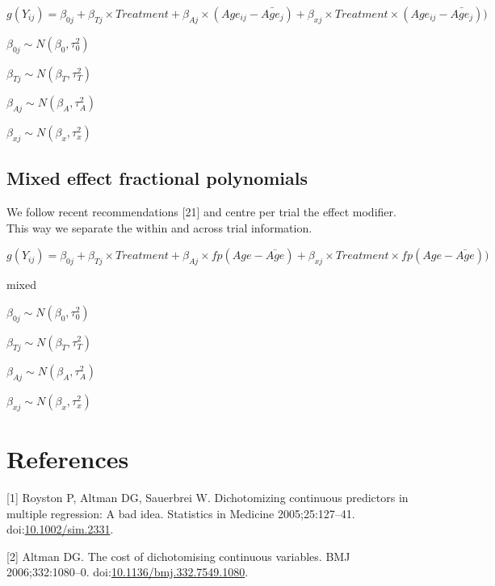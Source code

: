 \documentclass[14pt,]{article}
\let\oldsubparagraph\subparagraph
\renewcommand{\subparagraph}[1]{\oldsubparagraph{#1}\mbox{}}
\begin{document}
\(g(Y_{ij}) = \beta_{0j} + \beta_{Tj} \times Treatment + \beta_{Aj} \times( Age_{ij} - \bar{Age_{j}}) + \beta_{xj} \times Treatment \times ( Age_{ij} - \bar{Age_{j}}))\)

\(\beta_{0j} \sim N(\beta_{0}, \tau_{0}^2)\)

\(\beta_{Tj} \sim N(\beta_{T}, \tau_{T}^2)\)

\(\beta_{Aj} \sim N(\beta_{A}, \tau_{A}^2)\)

\(\beta_{xj} \sim N(\beta_{x}, \tau_{x}^2)\)

\subsection{Mixed effect fractional
polynomials}\label{mixed-effect-fractional-polynomials}

We follow recent recommendations {[}21{]} and centre per trial the
effect modifier. This way we separate the within and across trial
information.

\(g(Y_{ij}) = \beta_{0j} + \beta_{Tj} \times Treatment + \beta_{Aj} \times fp( Age - \bar{Age}) + \beta_{xj} \times Treatment \times fp( Age - \bar{Age}))\)

mixed

\(\beta_{0j} \sim N(\beta_{0}, \tau_{0}^2)\)

\(\beta_{Tj} \sim N(\beta_{T}, \tau_{T}^2)\)

\(\beta_{Aj} \sim N(\beta_{A}, \tau_{A}^2)\)

\(\beta_{xj} \sim N(\beta_{x}, \tau_{x}^2)\)

\newpage

\subparagraph{}\label{section-2}

\newpage

\subparagraph{}\label{section-3}

\section*{References}\label{references}

\hypertarget{refs}{}
\hypertarget{ref-Royston_2005}{}
{[}1{]} Royston P, Altman DG, Sauerbrei W. Dichotomizing continuous
predictors in multiple regression: A bad idea. Statistics in Medicine
2005;25:127--41.
doi:\href{https://doi.org/10.1002/sim.2331}{10.1002/sim.2331}.

\hypertarget{ref-Altman_2006}{}
{[}2{]} Altman DG. The cost of dichotomising continuous variables. BMJ
2006;332:1080--0.
doi:\href{https://doi.org/10.1136/bmj.332.7549.1080}{10.1136/bmj.332.7549.1080}.
\end{document}
